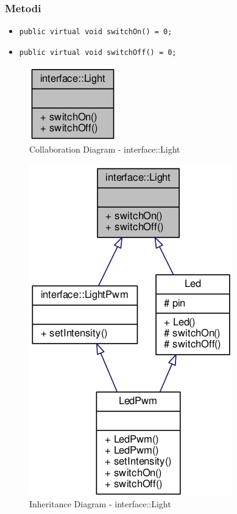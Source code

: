 \subsubsection{Metodi}
\begin{itemize}
	\item \texttt{public virtual void switchOn() = 0;}
	\item \texttt{public virtual void switchOff() = 0;}
\end{itemize}
\begin{figure}[!ht]
	\centering
	\includegraphics[scale=.5]{img/UML/CollaborationDiagram/interface/interface::Light.png}
	\caption{Collaboration Diagram - interface::Light}
\end{figure}
\begin{figure}[!ht]
	\centering
	\includegraphics[scale=.35]{img/UML/InheritanceDiagram/interface/interface::Light.png}
	\caption{Inheritance Diagram - interface::Light}
\end{figure}


